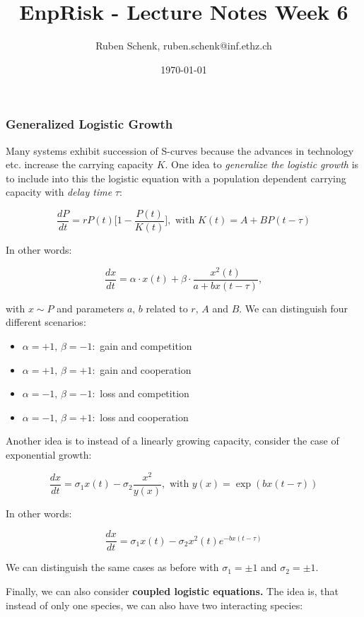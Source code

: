 \documentclass[a4paper]{extarticle}
\title{EnpRisk - Lecture Notes Week 6}
\author{Ruben Schenk, ruben.schenk@inf.ethz.ch}
\date{\today}
\begin{document}
\maketitle

\subsubsection{Generalized Logistic Growth}

Many systems exhibit succession of S-curves because the advances in technology etc. increase the carrying capacity $K$. One idea to \textit{generalize the logistic growth} is to include into this the logistic equation with a population dependent carrying capacity with \textit{delay time} $\tau$:

\[
    \frac{dP}{dt} = rP(t) \big[1 - \frac{P(t)}{K(t)}\big], \text{ with } K(t) = A + BP(t - \tau)
\]

In other words:

\[
    \frac{dx}{dt} = \alpha \cdot x(t) + \beta \cdot \frac{x^2(t)}{a + bx(t - \tau)},
\]

with $x \sim P$ and parameters $a, \, b$ related to $r, \, A$ and $B$. We can distinguish four different scenarios:

\begin{itemize}
    \item $\alpha = +1, \, \beta = -1:$ gain and competition
    \item $\alpha = +1, \, \beta = +1:$ gain and cooperation
    \item $\alpha = -1, \, \beta = -1:$ loss and competition
    \item $\alpha = -1, \, \beta = +1:$ loss and cooperation
\end{itemize}

Another idea is to instead of a linearly growing capacity, consider the case of exponential growth:

\[
    \frac{dx}{dt} = \sigma_1 x(t) - \sigma_2 \frac{x^2}{y(x)}, \text{ with } y(x) = \exp(bx(t - \tau))
\]

In other words:

\[
    \frac{dx}{dt} = \sigma_1 x(t) - \sigma_2 x^2(t)e^{-bx(t - \tau)}
\]

We can distinguish the same cases as before with $\sigma_1 = \pm 1$ and $\sigma_2 = \pm 1$.

Finally, we can also consider \textbf{coupled logistic equations.} The idea is, that instead of only one species, we can also have two interacting species:
\end{document}
